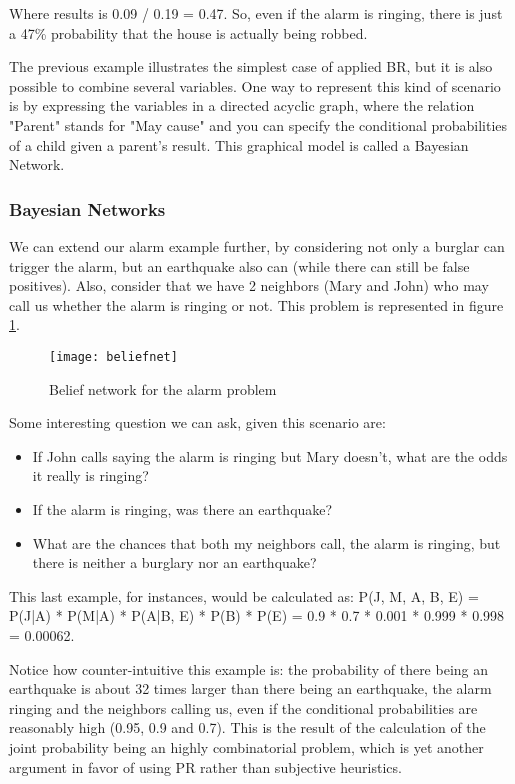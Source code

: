 Where results is 0.09 / 0.19 = 0.47. So, even if the alarm is ringing, there is
just a 47\% probability that the house is actually being robbed.

The previous example illustrates the simplest case of applied BR, but it is
also possible to combine several variables.
One way to represent this kind of scenario is by expressing the variables in a directed acyclic
graph, where the relation "Parent" stands for "May cause" and you can specify
the conditional probabilities of a child given a parent's result. This graphical
model is called a Bayesian Network.

\subsubsection{Bayesian Networks}

We can extend our alarm example further, by considering not only a burglar
can trigger the alarm, but an earthquake also can (while there can still be
false positives). Also, consider that we have 2 neighbors (Mary and John) who
may call us whether the alarm is ringing or not. This problem is represented in
figure \ref{fig:beliefnet}.

\begin{figure}[t]
  \begin{center}
    \leavevmode
    \texttt{[image: beliefnet]}
    \caption{Belief network for the alarm problem \cite{belfn}}
    \label{fig:beliefnet}
  \end{center}
\end{figure}

Some interesting question we can ask, given this scenario are:

\begin{itemize}
  \item If John calls saying the alarm is ringing but Mary doesn't, what are the
odds it really is ringing?
  \item If the alarm is ringing, was there an earthquake?
  \item What are the chances that both my neighbors call, the alarm is ringing,
but there is neither a burglary nor an earthquake?
\end{itemize}

This last example, for instances, would be calculated as: P(J, M, A, \neg B, \neg E)
= P(J|A) * P(M|A) * P(A|\neg B, \neg E) * P(\neg B) * P(\neg E) =
0.9 * 0.7 * 0.001 * 0.999 * 0.998 = 0.00062.

Notice how counter-intuitive this
example is: the probability of there being an earthquake is about 32 times larger
than there being an earthquake, the alarm ringing and the neighbors calling us,
even if the conditional probabilities are reasonably high (0.95, 0.9 and 0.7).
This is the result of the calculation of the joint probability being an highly
combinatorial problem, which is yet another argument in favor of using PR
rather than subjective heuristics.

